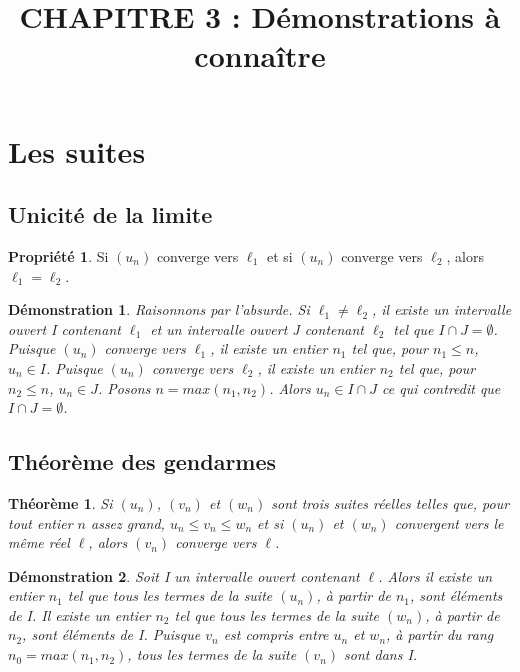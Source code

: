 \documentclass[a4paper,12pt,final]{article}
\title{CHAPITRE 3 : Démonstrations à connaître}
\newtheorem{Proof}{Démonstration}[section]
\theoremstyle{theorem}
\newtheorem{Th}{Théorème}[section]
\theoremstyle{definition}
\newtheorem{Propriete}{Propriété}[section]
\theoremstyle{definition}
\theoremstyle{definition}
\begin{document}
	
	\maketitle


\section{Les suites}

	\subsection{Unicité de la limite}

\begin{Propriete}
	Si $(u_{n})$ converge vers $\ell_{1}$ et si $(u_{n})$ converge vers $\ell_{2}$, alors $\ell_{1} = \ell_{2}$.
\end{Propriete}

\begin{Proof}
	Raisonnons par l'absurde. Si $\ell_{1} \ne \ell_{2}$, il existe un intervalle ouvert I contenant $\ell_{1}$ et un intervalle ouvert J contenant $\ell_{2}$ tel que $I\cap J = \emptyset$. Puisque $(u_{n})$ converge vers $\ell_{1}$, il existe un entier $n_{1}$ tel que, pour $n_{1} \leq n$, $u_{n} \in I$. Puisque $(u_{n})$ converge vers $\ell_{2}$, il existe un entier $n_{2}$ tel que, pour $n_{2} \leq n$, $u_{n} \in J$. Posons $n=max(n_{1},n_{2})$. Alors $u_{n} \in I\cap J$ ce qui contredit que $I\cap J = \emptyset$.
\end{Proof}

	\subsection{Théorème des gendarmes}

\begin{Th}
	Si $(u_{n})$, $(v_{n})$ et $(w_{n})$ sont trois suites réelles telles que, pour tout entier $n$ assez grand, $u_{n} \leq v_{n} \leq w_{n}$ et si $(u_{n})$ et $(w_{n})$ convergent vers le même réel $\ell$, alors $(v_{n})$ converge vers $\ell$.
\end{Th}

\begin{Proof}
	Soit I un intervalle ouvert contenant $\ell$. Alors il existe un entier $n_{1}$ tel que tous les termes de la suite $(u_{n})$, à partir de $n_{1}$, sont éléments de I. Il existe un entier $n_{2}$ tel que tous les termes de la suite $(w_{n})$, à partir de $n_{2}$, sont éléments de I. Puisque $v_{n}$ est compris entre $u_{n}$ et $w_{n}$, à partir du rang $n_{0}=max(n_{1},n_{2})$, tous les termes de la suite $(v_{n})$ sont dans I.
\end{Proof}
\end{document}
